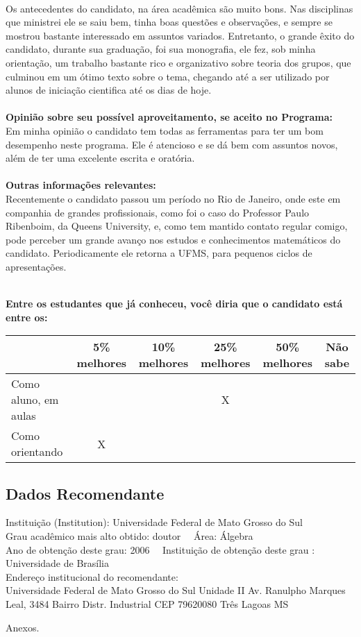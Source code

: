 \documentclass[11pt]{article}
\begin{document}
\\Os antecedentes do candidato, na área acadêmica são muito bons. Nas disciplinas que ministrei ele se saiu bem, tinha boas questões e observações, e sempre se mostrou bastante interessado em assuntos variados. Entretanto, o grande êxito do candidato, durante sua graduação, foi sua monografia, ele fez, sob minha orientação, um trabalho bastante rico e organizativo sobre teoria dos grupos, que culminou em um ótimo texto sobre o tema, chegando até a ser utilizado por alunos de iniciação cientifica até os dias de hoje. \\
\\
\textbf{Opinião sobre seu possível aproveitamento, se aceito no Programa:}
\\Em minha opinião o candidato tem todas as ferramentas para ter um bom desempenho neste programa. Ele é atencioso e se dá bem com assuntos novos, além de ter uma excelente escrita e oratória. \\ 
\\
\textbf{Outras informações relevantes:} \\Recentemente o candidato passou um período no Rio de Janeiro, onde este em companhia de grandes profissionais, como foi o caso do Professor Paulo Ribenboim, da Queens University, e, como tem mantido contato regular comigo, pode perceber um grande avanço nos estudos e conhecimentos matemáticos do candidato. Periodicamente ele retorna a UFMS, para pequenos ciclos de apresentações. 

\\[0.3cm]
\textbf{Entre os estudantes que já conheceu, você diria que o candidato está entre os:}
\\
\begin{tabular}{|l|c|c|c|c|c|}
\hline
 & 5\% melhores & 10\% melhores & 25\% melhores & 50\% melhores & Não sabe \\
\hline
Como aluno, em aulas &  &  & X &  & \\
\hline
Como orientando & X &  &  &  & \\
\hline
\end{tabular}
\subsection*{Dados Recomendante} 
	Instituição (Institution): Universidade Federal de Mato Grosso do Sul
\\ 
	Grau acadêmico mais alto obtido: doutor
	\ \ Área: Álgebra
	\\
	Ano de obtenção deste grau: 2006
	\ \ 
	Instituição de obtenção deste grau : Universidade de Brasília
	\\ 
	Endereço institucional do recomendante: \\ Universidade Federal de Mato Grosso do Sul
Unidade II
Av. Ranulpho Marques Leal, 3484
Bairro Distr. Industrial
CEP 79620080
Três Lagoas MS  
\begin{center}
Anexos.
\end{center}
\end{document}
